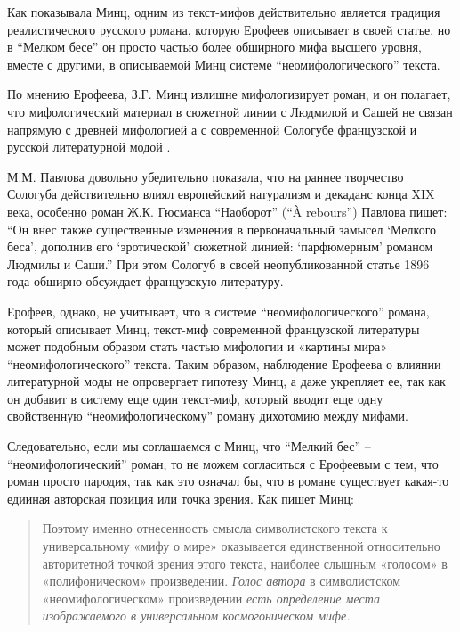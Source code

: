 \documentclass[12pt,a4paper]{article}
\begin{document}

 
Как показывала Минц, одним из текст-мифов действительно является традиция реалистического русского романа, которую Ерофеев описывает в своей статье, но в \enquote{Мелком бесе} он просто частью более обширного мифа высшего уровня, вместе с другими, в описываемой Минц системе \enquote{неомифологического} текста.

По мнению Ерофеева, З.Г. Минц излишне мифологизирует роман, и он полагает, что мифологический материал в сюжетной линии с Людмилой и Сашей не связан напрямую с древней мифологией а с современной Сологубе французской и русской литературной модой \parencite[152]{jerofeev1985}.

М.М. Павлова довольно убедительно показала, что на раннее творчество Сологуба действительно влиял европейский натурализм и декаданс конца XIX века, особенно роман Ж.К. Гюсманса \enquote{Наоборот} (\enquote{À rebours}) Павлова пишет: \enquote{Он внес также существенные изменения в первоначальный замысел \enquote{Мелкого беса}, дополнив его \enquote{эротической} сюжетной линией: \enquote{парфюмерным} романом Людмилы и Саши.} \parencite*[168.]{pavlova2007} При этом Сологуб в своей неопубликованной статье 1896 года  обширно обсуждает французскую литературу.

Ерофеев, однако, не учитывает, что в системе \enquote{неомифологического} романа, который описывает Минц, текст-миф современной французской литературы может подобным образом стать частью мифологии и «картины мира» \enquote{неомифологического} текста. Таким образом, наблюдение Ерофеева о влиянии литературной моды не опровергает гипотезу Минц, а даже укрепляет ее, так как он добавит в систему еще один текст-миф, который вводит еще одну свойственную \enquote{неомифологическому} роману дихотомию между мифами.

Следовательно, если мы соглашаемся с Минц, что \enquote{Мелкий бес} -- \enquote{неомифологический} роман, то не можем согласиться с Ерофеевым с тем, что роман просто пародия, так как это означал бы, что в романе существует какая-то едииная авторская позиция или точка зрения. Как пишет Минц:

\begin{quote}
Поэтому именно отнесенность смысла символистского текста к универсальному «мифу о мире» оказывается единственной относительно авторитетной точкой зрения этого текста, наиболее слышным «голосом» в «полифоническом» произведении. \emph{Голос автора} в символистском «неомифологическом» произведении \emph{есть определение места изображаемого в универсальном космогоническом мифе.}
\parencite[77.]{mints2004}
\end{quote}
\end{document}
